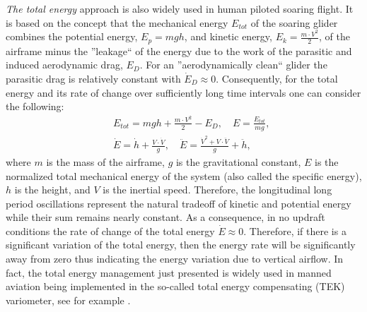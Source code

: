 \documentclass{ifacconf}
\begin{document}
\emph{The total energy} approach is also widely used in human piloted soaring
flight. It is based on the concept that the mechanical energy $E_{tot}$ of
the soaring glider combines the potential energy, $E_p=mgh$, and kinetic
energy, $E_k=\frac{m\cdot V^2}{2}$, of the airframe minus the ''leakage`` of
the energy due to the work of the parasitic and induced aerodynamic drag,
$E_{D}$. For an ''aerodynamically clean`` glider the parasitic drag is relatively
constant  with $\dot{E}_{D}\approx0$.
Consequently, for the total energy and its rate of change over sufficiently
long time intervals one can consider the following:
\begin{eqnarray}
    && E_{tot}=mgh+\frac{m\cdot V^2}{2}-E_{D}, \quad E=\frac{E_{tot}}{mg}, \nonumber \\
    && \dot{E}=\dot{h}+\frac{V \cdot \dot{V}}{g}, \quad \ddot{E}=\frac{\dot{V}^2 + V \cdot
    \ddot{V}}{g} + \ddot{h},
    \label{eq:totenergyrate}
\end{eqnarray}
where $m$ is the mass of the airframe, $g$ is the gravitational constant, $E$
is the normalized total mechanical energy of the system (also called the
specific energy), $h$ is the height, and $V$ is the inertial speed.
Therefore, the longitudinal long period oscillations represent the natural
tradeoff of kinetic and potential energy while their sum remains nearly
constant. As a consequence, in no updraft conditions the rate of change of
the total energy $\dot{E}\approx 0$. Therefore, if there is a significant
variation of the total energy, then the energy rate will be significantly
away from zero thus indicating the energy variation due to vertical airflow.
In fact, the total energy management just presented is widely used in manned
aviation being implemented in the so-called total energy compensating (TEK)
variometer, see for example \cite{PitLab:2013:Online}.
\end{document}
